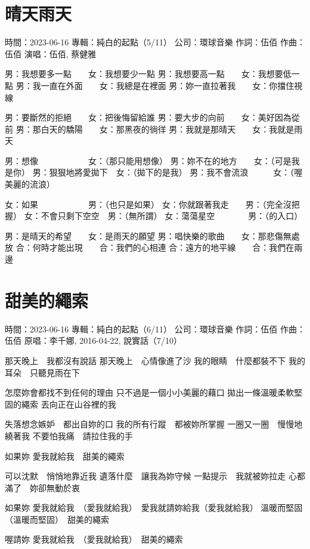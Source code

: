 \documentclass[UTF8,a4paper,oneside,twocolumn,12pt]{ctexbook}
\newcommand{\infopair}[2]{\textbullet #1：#2}
\newcommand{\zc}[1][伍佰]{\infopair{作詞}{#1}}
\newcommand{\zq}[1][伍佰]{\infopair{作曲}{#1}}
\newcommand{\zj}[1]{\infopair{專輯}{#1}}
\newcommand{\yc}[1]{\infopair{原唱}{#1}}
\newcommand{\sj}[1]{\infopair{時間}{#1}}
\newcommand{\gs}[1]{\infopair{公司}{#1}}
\newenvironment{info}{\begin{flushleft}\kaishu
	}
	{\end{flushleft}\normalsize\yahei\par}
\newenvironment{lyric}{
	}
{}
\begin{document}
\section{晴天雨天}
\begin{info}
	\sj{2023-06-16}
	\zj{純白的起點（5/11）}
	\gs{環球音樂}
	\zc
	\zq
	\infopair{演唱}{伍佰, 蔡健雅}
\end{info}
\begin{lyric}
	男：我想要多一點　　女：我想要少一點
	男：我想要高一點　　女：我想要低一點
	男：我一直在外面　　女：我總是在裡面
	男：妳一直拉著我　　女：你擋住視線

	男：要斷然的拒絕　　女：把後悔留給誰
	男：要大步的向前　　女：美好因為從前
	男：那白天的驕陽　　女：那黑夜的徜徉
	男：我就是那晴天　　女：我就是雨天

	男：想像　　　　　　女：（那只能用想像）
	男：妳不在的地方　　女：（可是我是你）
	男：狠狠地將愛拋下　女：（拋下的是我）
	男：我不會流浪　　　女：（喔美麗的流浪）

	女：如果　　　　　　男：（也只是如果）
	女：你就跟著我走　　男：（完全沒把握）
	女：不會只剩下空空　男：（無所謂）
	女：蕩蕩星空　　　　男：（的入口）

	男：是晴天的希望　　女：是雨天的願望
	男：唱快樂的歌曲　　女：那悲傷無處放
	合：何時才能出現　　合：我們的心相連
	合：遠方的地平線　　合：我們在兩邊
\end{lyric}

\section{甜美的繩索}
\begin{info}
	\sj{2023-06-16}
	\zj{純白的起點（6/11）}
	\gs{環球音樂}
	\zc
	\zq
	\yc{李千娜, 2016-04-22, 說實話（7/10）}
\end{info}
\begin{lyric}
	那天晚上　我都沒有說話
	那天晚上　心情像進了沙
	我的眼睛　什麼都裝不下
	我的耳朵　只聽見雨在下

	怎麼妳會都找不到任何的理由
	只不過是一個小小美麗的藉口
	拋出一條溫暖柔軟堅固的繩索
	丟向正在山谷裡的我

	失落想念嫉妒　都出自妳的口
	我的所有行蹤　都被妳所掌握
	一圈又一圈　慢慢地繞著我
	不要怕我痛　請拉住我的手

	如果妳
	愛我就給我　甜美的繩索

	可以沈默　悄悄地靠近我
	遺落什麼　讓我為妳守候
	一點提示　我就被妳拉走
	心都滿了　妳卻無動於衷

	如果妳
	愛我就給我　（愛我就給我）　愛我就請妳給我（愛我就給我）
	溫暖而堅固　（溫暖而堅固）　甜美的繩索

	喔請妳
	愛我就給我　（愛我就給我）　甜美的繩索
\end{lyric}
\end{document}
